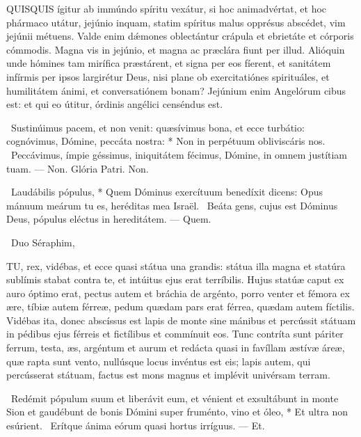 
\lettrine[lines=2]{Q}{UISQUIS} ígitur ab immúndo spíritu vexátur, si hoc animadvértat, et hoc phármaco utátur, jejúnio inquam, statim spíritus malus opprésus abscédet, vim jejúnii métuens. Valde enim dǽmones oblectántur crápula et ebrietáte et córporis cómmodis. Magna vis in jejúnio, et magna ac præclára fiunt per illud. Alióquin unde hómines tam mirífica præstárent, et signa per eos fíerent, et sanitátem infírmis per ipsos largirétur Deus, nisi plane ob exercitatiónes spirituáles, et humilitátem ánimi, et conversatiónem bonam? Jejúnium enim Angelórum cibus est: et qui eo útitur, órdinis angélici censéndus est.

\R\ Sustinúimus pacem, et non venit: quæsívimus bona, et ecce turbátio: cognóvimus, Dómine, peccáta nostra: * Non in perpétuum obliviscáris nos. \V\ Peccávimus, ímpie géssimus, iniquitátem fécimus, Dómine, in omnem justítiam tuam. — Non. Glória Patri. Non.

\R\ Laudábilis pópulus, * Quem Dóminus exercítuum benedíxit dicens: Opus mánuum meárum tu es, heréditas mea Israël. \V\ Beáta gens, cujus est Dóminus Deus, pópulus eléctus in hereditátem. — Quem.

\R\ Duo Séraphim, 




\lettrine[lines=2]{T}{U}, rex, vidébas, et ecce quasi státua una grandis: státua illa magna et statúra sublímis stabat contra te, et intúitus ejus erat terríbilis. Hujus statúæ caput ex auro óptimo erat, pectus autem et bráchia de argénto, porro venter et fémora ex ære, tíbiæ autem férreæ, pedum quædam pars erat férrea, quædam autem fíctilis. Vidébas ita, donec abscíssus est lapis de monte sine mánibus et percússit státuam in pédibus ejus férreis et fictílibus et commínuit eos. Tunc contríta sunt páriter ferrum, testa, æs, argéntum et aurum et redácta quasi in favíllam æstívæ áreæ, quæ rapta sunt vento, nullúsque locus invéntus est eis; lapis autem, qui percússerat státuam, factus est mons magnus et implévit univérsam terram.

\R\ Redémit pópulum suum et liberávit eum, et vénient et exsultábunt in monte Sion et gaudébunt de bonis Dómini super fruménto, vino et óleo, * Et ultra non esúrient. \V\ Erítque ánima eórum quasi hortus irríguus. — Et.

